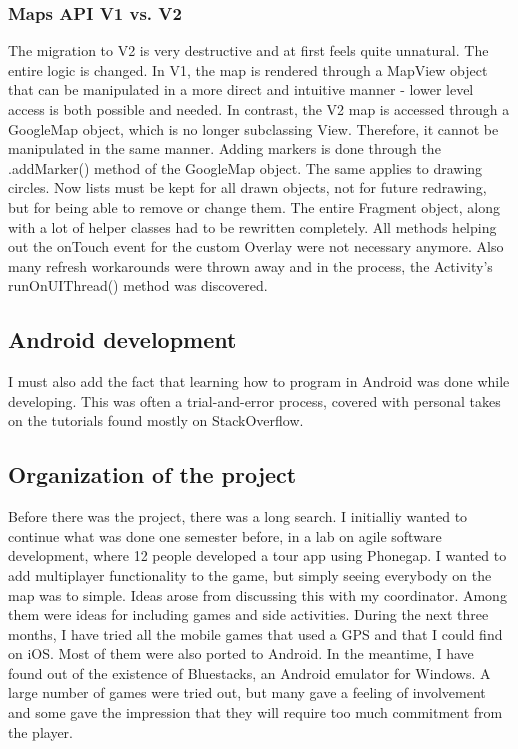 \documentclass{article}
\begin{document}
\subsubsection{Maps API V1 vs. V2}

The migration to V2 is very destructive and at first feels quite unnatural. The
entire logic is changed. In V1, the map is rendered through a MapView object
that can be manipulated in a more direct and intuitive manner - lower level
access is both possible and needed. In contrast, the V2 map is accessed through
a GoogleMap object, which is no longer subclassing View. Therefore, it cannot be
manipulated in the same manner. Adding markers is done through the .addMarker()
method of the GoogleMap object. The same applies to drawing circles. Now lists
must be kept for all drawn objects, not for future redrawing, but for being able
to remove or change them. The entire Fragment object, along with a lot of
helper classes had to be rewritten completely. All methods helping out the
onTouch event for the custom Overlay were not necessary anymore. Also many
refresh workarounds were thrown away and in the process, the Activity's
runOnUIThread() method was discovered. 

\subsection{Android development}

I must also add the fact that learning how to program in Android was done while
developing. This was often a trial-and-error process, covered with personal
takes on the tutorials found mostly on StackOverflow.

\subsection{Organization of the project}

Before there was the project, there was a long search. I initialliy wanted to
continue what was done one semester before, in a lab on agile software
development, where 12 people developed a tour app using Phonegap. I wanted to
add multiplayer functionality to the game, but simply seeing everybody on the
map was to simple. Ideas arose from discussing this with my coordinator. Among
them were ideas for including games and side activities. During the next three
months, I have tried all the mobile games that used a GPS and that I could find
on iOS. Most of them were also ported to Android. In the meantime, I have found
out of the existence of Bluestacks, an Android emulator for Windows. A large
number of games were tried out, but many gave a feeling of involvement and some
gave the impression that they will require too much commitment from the player.
\end{document}
